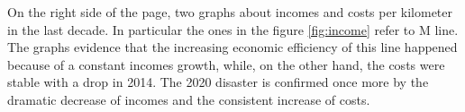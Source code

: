 On the right side of the page, two graphs about incomes and costs per kilometer in the last decade. In particular the ones in the figure \ref{fig:income} refer to M line. The graphs evidence that the increasing economic efficiency of this line happened because of a constant incomes growth, while, on the other hand, the costs were stable with a drop in 2014. The 2020 disaster is confirmed once more by the dramatic decrease of incomes and the consistent increase of costs.
\newpage
\begin{landscape}
\thispagestyle{empty}

\end{landscape}
\WarningsOn
